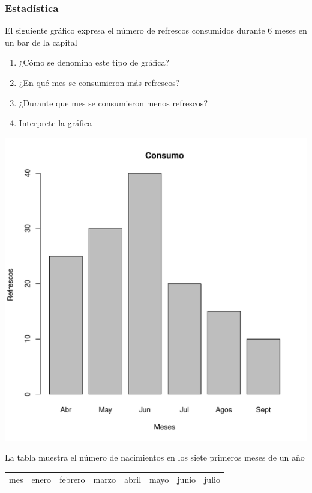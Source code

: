 \documentclass[letterpaper,11pt,twoside]{article}
\begin{document}
\begin{enumerate}
\subsubsection*{Estad\'{i}stica}
\begin{minipage}{.4\textwidth}
\item El siguiente gr\'{a}fico expresa el n\'{u}mero de refrescos consumidos durante 6 meses en un bar de la capital
\begin{enumerate}
\item ¿Cómo se denomina este tipo de gráfica?
\item ¿En qué mes se consumieron más refrescos?
\item ¿Durante que mes se consumieron menos refrescos?
\item Interprete la gráfica
\end{enumerate}
\end{minipage} \hfill
\begin{minipage}{.55\textwidth}
\includegraphics[scale=.5]{Images/refrescosgraf.pdf}   
\end{minipage}
\item La tabla muestra el número de nacimientos en los siete primeros meses de un año
\begin{center}
\begin{tabular}{|c|c|c|c|c|c|c|c|}
\hline 
mes & enero & febrero & marzo & abril & mayo & junio & julio \\ 

\end{tabular}
\end{center}
\end{enumerate}
\end{document}
